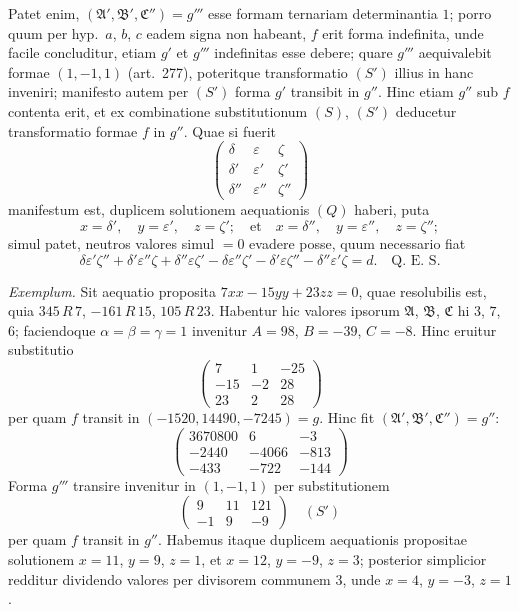 \documentclass[12pt,a4paper]{article}
\theoremstyle{plain}
\theoremstyle{definition}
\theoremstyle{remark}
\begin{document}
Patet enim, $(\mathfrak{A}', \mathfrak{B}', \mathfrak{C}'') = g'''$ esse formam ternariam determinantia $1$; porro quum per hyp.~$a$, $b$, $c$ eadem signa non habeant, $f$ erit forma indefinita, unde facile concluditur, etiam $g'$ et $g'''$ indefinitas esse debere; quare $g'''$ aequivalebit formae $(1, -1, 1)$ (art.~277), poteritque transformatio $(S')$ illius in hanc inveniri; manifesto autem per $(S')$ forma $g'$ transibit in $g''$. Hinc etiam $g''$ sub $f$ contenta erit, et ex combinatione substitutionum $(S)$, $(S')$ deducetur transformatio formae $f$ in $g''$. Quae si fuerit
\[
\begin{pmatrix}
\delta & \varepsilon & \zeta \\
\delta' & \varepsilon' & \zeta' \\
\delta'' & \varepsilon'' & \zeta''
\end{pmatrix}
\]
manifestum est, duplicem solutionem aequationis $(Q)$ haberi, puta
\[
x = \delta',\quad y = \varepsilon',\quad z = \zeta'; \quad\text{et}\quad x = \delta'',\quad y = \varepsilon'',\quad z = \zeta'';
\]
simul patet, neutros valores simul $= 0$ evadere posse, quum necessario fiat
\[
\delta\varepsilon'\zeta'' + \delta'\varepsilon''\zeta + \delta''\varepsilon\zeta' - \delta\varepsilon''\zeta' - \delta'\varepsilon\zeta'' - \delta''\varepsilon'\zeta = d. \quad\text{Q.~E.~S.}
\]

\textit{Exemplum.} Sit aequatio proposita $7xx - 15yy + 23zz = 0$, quae resolubilis est, quia $345 \, R \, 7$, $-161 \, R \, 15$, $105 \, R \, 23$. Habentur hic valores ipsorum $\mathfrak{A}$, $\mathfrak{B}$, $\mathfrak{C}$ hi $3$, $7$, $6$; faciendoque $\alpha = \beta = \gamma = 1$ invenitur $A = 98$, $B = -39$, $C = -8$. Hinc eruitur substitutio
\[
\begin{pmatrix}
7 & 1 & -25 \\
-15 & -2 & 28 \\
23 & 2 & 28
\end{pmatrix}
\]
per quam $f$ transit in $(-1520, 14490, -7245) = g$. Hinc fit $(\mathfrak{A}', \mathfrak{B}', \mathfrak{C}'') = g''$:
\[
\begin{pmatrix}
3670800 & 6 & -3 \\
-2440 & -4066 & -813 \\
-433 & -722 & -144
\end{pmatrix}
\]
Forma $g'''$ transire invenitur in $(1, -1, 1)$ per substitutionem
\[
\begin{pmatrix}
9 & 11 & 121 \\
-1 & 9 & -9
\end{pmatrix}
\quad (S')
\]
per quam $f$ transit in $g''$. Habemus itaque duplicem aequationis propositae solutionem $x = 11$, $y = 9$, $z = 1$, et $x = 12$, $y = -9$, $z = 3$; posterior simplicior redditur dividendo valores per divisorem communem $3$, unde $x = 4$, $y = -3$, $z = 1$.
\end{document}
